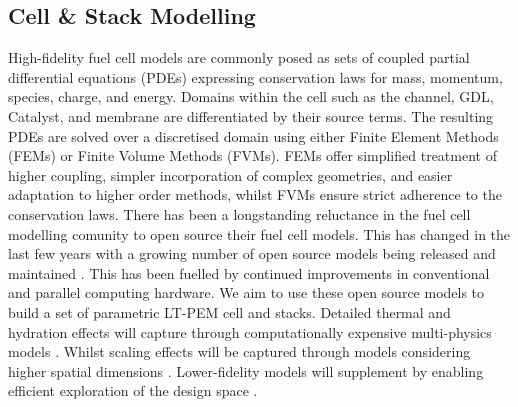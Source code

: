 \subsection{Cell \& Stack Modelling}
High-fidelity fuel cell models are commonly posed as sets of coupled partial differential equations (PDEs) expressing conservation laws for mass, momentum, species, charge, and energy.
Domains within the cell such as the channel, GDL, Catalyst, and membrane are differentiated by their source terms. The resulting PDEs are solved over a discretised domain using either Finite Element Methods (FEMs) or Finite Volume Methods (FVMs).
FEMs offer simplified treatment of higher coupling, simpler incorporation of complex geometries, and easier adaptation to higher order methods, whilst FVMs ensure strict adherence to the conservation laws.
There has been a longstanding reluctance in the fuel cell modelling comunity to open source their fuel cell models.
This has changed in the last few years with a growing number of open source models being released and maintained \cite{vetterFreeOpenReference2019, secanellOpenFCSTOpenSourceMathematical2014, zhangOpenFuelCell2NewComputational2024,  koneOpenSourceToolboxPEM2018, gassAlphaPEMOpensourceDynamic2025}.
This has been fuelled by continued improvements in conventional and parallel computing hardware.
We aim to use these open source models to build a set of parametric LT-PEM cell and stacks. Detailed thermal and hydration effects will capture through computationally expensive multi-physics models \cite{secanellOpenFCSTOpenSourceMathematical2014, zhangOpenFuelCell2NewComputational2024, vetterFreeOpenReference2019}. Whilst scaling effects will be captured through models considering higher spatial dimensions \cite{secanellOpenFCSTOpenSourceMathematical2014, zhangOpenFuelCell2NewComputational2024, koneOpenSourceToolboxPEM2018a}. Lower-fidelity models will supplement by enabling efficient exploration of the design space \cite{kulikovskyPhysicallyBasedAnalytical2013a, ohayreFuelCellFundamentals2016, larminieFuelCellSystems2003}.

